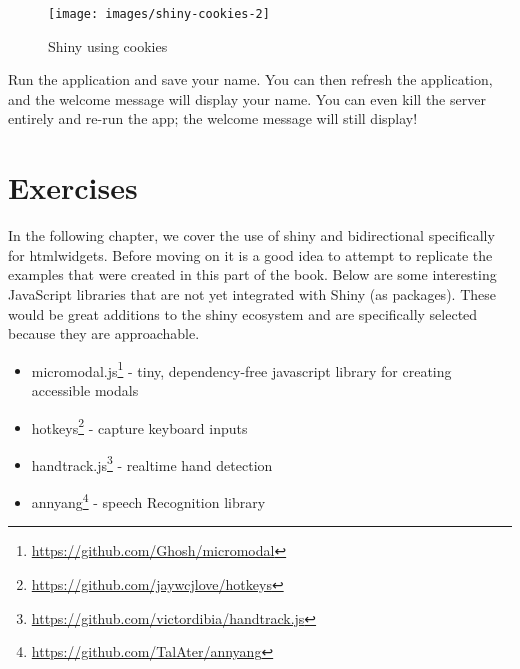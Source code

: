 \documentclass[
  10pt,
]{krantz}
\makeatletter
\newenvironment{Shaded}{\begin{snugshade}}{\end{snugshade}}
\newcommand{\CommentTok}[1]{\textcolor[rgb]{0.37,0.37,0.37}{\textit{#1}}}
\newcommand{\ControlFlowTok}[1]{\textcolor[rgb]{0.27,0.27,0.27}{\textbf{#1}}}
\newcommand{\KeywordTok}[1]{\textcolor[rgb]{0.27,0.27,0.27}{\textbf{#1}}}
\newcommand{\NormalTok}[1]{#1}
\newcommand{\OperatorTok}[1]{\textcolor[rgb]{0.43,0.43,0.43}{\textbf{#1}}}
\newcommand{\StringTok}[1]{\textcolor[rgb]{0.5,0.5,0.5}{#1}}
\providecommand{\tightlist}{%
  \setlength{\itemsep}{0pt}\setlength{\parskip}{0pt}}
\renewcommand{\href}[2]{#2\footnote{\url{#1}}}
\newenvironment{kframe}{%
\medskip{}
\setlength{\fboxsep}{.8em}
 \def\at@end@of@kframe{}%
 \ifinner\ifhmode%
  \def\at@end@of@kframe{\end{minipage}}%
  \begin{minipage}{\columnwidth}%
 \fi\fi%
 \def\FrameCommand##1{\hskip\@totalleftmargin \hskip-\fboxsep
 \colorbox{shadecolor}{##1}\hskip-\fboxsep
     \hskip-\linewidth \hskip-\@totalleftmargin \hskip\columnwidth}%
 \MakeFramed {\advance\hsize-\width
   \@totalleftmargin\z@ \linewidth\hsize
   \@setminipage}}%
 {\par\unskip\endMakeFramed%
 \at@end@of@kframe}
\renewenvironment{Shaded}{\begin{kframe}}{\end{kframe}}
\makeatother
\begin{document}
\begin{Shaded}
\end{Shaded}

\begin{figure}[H]

{\centering \texttt{[image: images/shiny-cookies-2]} 

}

\caption{Shiny using cookies}\label{fig:shiny-cookies}
\end{figure}

Run the application and save your name. You can then refresh the application, and the welcome message will display your name. You can even kill the server entirely and re-run the app; the welcome message will still display!

\hypertarget{shiny-cookies-exercises}{%
\section{Exercises}\label{shiny-cookies-exercises}}

In the following chapter, we cover the use of shiny and bidirectional specifically for htmlwidgets. Before moving on it is a good idea to attempt to replicate the examples that were created in this part of the book. Below are some interesting JavaScript libraries that are not yet integrated with Shiny (as packages). These would be great additions to the shiny ecosystem and are specifically selected because they are approachable.

\begin{itemize}
\tightlist
\item
  \href{https://github.com/Ghosh/micromodal}{micromodal.js} - tiny, dependency-free javascript library for creating accessible modals
\item
  \href{https://github.com/jaywcjlove/hotkeys}{hotkeys} - capture keyboard inputs
\item
  \href{https://github.com/victordibia/handtrack.js}{handtrack.js} - realtime hand detection
\item
  \href{https://github.com/TalAter/annyang}{annyang} - speech Recognition library
\end{itemize}
\end{document}
